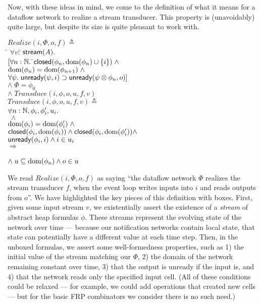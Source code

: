 \documentclass[preprint,natbib]{sigplanconf}
\begin{document}
Now, with these ideas in mind, we come to the definition of what it
means for a dataflow network to realize a stream transducer. This
property is (unavoidably) quite large, but despite its size is quite
pleasant to work with.
\begin{tabbing}
$Realize(i, \Phi, o, f) \triangleq$ \\
\;\;\= $\forall v:$\=$\,\mbox{\textsf{{stream}}}({A}).\;$  \\
\>\> $[\forall n:\mathbb{N}.\;$\=$\mbox{\textsf{{closed}}}({\phi_n}, {\mbox{dom}({\phi_n}) \cup \{{i}\}}) \;\land$ \\
\>\>\>$\mbox{dom}({\phi_n}) = \mbox{dom}({\phi_{n+1}})\; \land$ \\
\>\>\>$\forall \psi.\; \mbox{\textsf{{unready}}}({\psi}, {i}) \supset \mbox{\textsf{{unready}}}({\psi \otimes \phi_n}, {o})]$ \\
\>\> $\land \; \Phi = \phi_0$ \\
\>\> $\land \;  Transduce(i, \phi, o, u, f, v)$ \\[1em]


$Transduce(i, \phi, o, u, f, v) \triangleq$ \\
\> $\forall $\=$ n:\mathbb{N}, \phi_i, \phi'_i, u_i.$ \\
\>\>  $\; \land$ \\
\>\> $\mbox{dom}({\phi_i}) = \mbox{dom}({\phi'_i}) \;\land $ \\
\>\> $\mbox{\textsf{{closed}}}({\phi_i}, {\mbox{dom}({\phi_i})}) \land 
      \mbox{\textsf{{closed}}}({\phi_i}, {\mbox{dom}({\phi'_i})}) \land $ \\
\>\> $\mbox{\textsf{{unready}}}({\phi_i}, {i}) \land
        i \in u_i$ \\
\>\> $\Longrightarrow$ \\
\>\>  \\
\>\> $\land\; u \subseteq \mbox{dom}({\phi_n}) \land o \in u$ \\
\end{tabbing}

We read $Realize(i, \Phi, o, f)$ as saying ``the dataflow network
$\Phi$ realizes the stream transducer $f$, when the event loop writes
inputs into $i$ and reads outputs from $o$''. We have highlighted the
key pieces of this definition with boxes. First, given some input
stream $v$, we existentially assert the existence of a \emph{stream}
of abstract heap formulas $\phi$. These streams represent the evolving
state of the network over time --- because our notification networks
contain local state, that state can potentially have a different value
at each time step. Then, in the unboxed formulas, we assert some
well-formedness properties, such as 1) the initial value of the stream
matching our $\Phi$, 2) the domain of the network remaining constant
over time, 3) that the output is unready if the input is, and 4) that
the network reads only the specified input cell. (All of these
conditions could be relaxed --- for example, we could add operations
that created new cells --- but for the basic FRP combinators we
consider there is no such need.)
\end{document}
